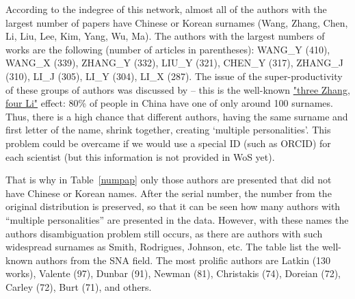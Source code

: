 \documentclass[11pt]{article} %
\begin{document}
According to the indegree of this network, almost all of the authors with the largest number of papers have Chinese or Korean surnames (Wang, Zhang, Chen, Li, Liu, Lee, Kim, Yang, Wu, Ma). The authors with the largest numbers of works are the following (number of articles in parentheses): WANG\_Y (410), WANG\_X (339), ZHANG\_Y (332), LIU\_Y (321), CHEN\_Y (317), ZHANG\_J (310), LI\_J (305), LI\_Y (304), LI\_X (287). The issue of the super-productivity of these groups of authors was discussed by \cite{harzing2015} -- this is the well-known \href{https://en.wikipedia.org/wiki/List_of_common_Chinese_surnames}{"three Zhang, four Li"} effect: 80\% of people in China have one of only around 100 surnames. Thus, there is a high chance that different authors, having the same surname and first letter of the name, shrink together, creating `multiple personalities'. This problem could be overcame if we would use a special ID (such as ORCID) for each scientist (but this information is not provided in WoS yet). \medskip 

That is why in Table~\ref{numpap} only those authors are presented that did not have Chinese or Korean names. After the serial number, the  number from the original distribution is preserved, so that it can be seen how many authors with ``multiple personalities'' are presented in the data. However, with these names the authors disambiguation problem still occurs, as there are authors with such widespread surnames as Smith, Rodrigues, Johnson, etc. The table list the well-known authors from the SNA field. The most prolific authors are Latkin (130 works), Valente (97), Dunbar (91), Newman (81), Christakis (74), Doreian (72), Carley (72), Burt (71), and others. 
\end{document}
